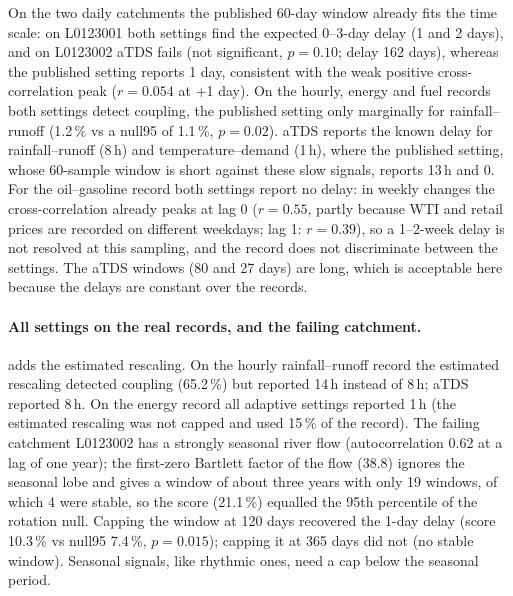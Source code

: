 \documentclass[11pt,a4paper]{article}
\begin{document}
On the two daily catchments the published 60-day window already fits the time scale: on L0123001 both settings find the expected 0--3-day delay (1 and 2 days), and on L0123002 aTDS fails (not significant, $p = 0.10$; delay 162 days), whereas the published setting reports 1 day, consistent with the weak positive cross-correlation peak ($r = 0.054$ at +1 day). On the hourly, energy and fuel records both settings detect coupling, the published setting only marginally for rainfall--runoff (1.2\,\% vs a null95 of 1.1\,\%, $p = 0.02$). aTDS reports the known delay for rainfall--runoff (8\,h) and temperature--demand (1\,h), where the published setting, whose 60-sample window is short against these slow signals, reports 13\,h and 0. For the oil--gasoline record both settings report no delay: in weekly changes the cross-correlation already peaks at lag 0 ($r = 0.55$, partly because WTI and retail prices are recorded on different weekdays; lag 1: $r = 0.39$), so a 1--2-week delay is not resolved at this sampling, and the record does not discriminate between the settings. The aTDS windows (80 and 27 days) are long, which is acceptable here because the delays are constant over the records.

\paragraph{All settings on the real records, and the failing catchment.}  adds the estimated rescaling. On the hourly rainfall--runoff record the estimated rescaling detected coupling (65.2\,\%) but reported 14\,h instead of 8\,h; aTDS reported 8\,h. On the energy record all adaptive settings reported 1\,h (the estimated rescaling was not capped and used 15\,\% of the record). The failing catchment L0123002 has a strongly seasonal river flow (autocorrelation 0.62 at a lag of one year); the first-zero Bartlett factor of the flow (38.8) ignores the seasonal lobe and gives a window of about three years with only 19 windows, of which 4 were stable, so the score (21.1\,\%) equalled the 95th percentile of the rotation null. Capping the window at 120 days recovered the 1-day delay (score 10.3\,\% vs null95 7.4\,\%, $p = 0.015$); capping it at 365 days did not (no stable window). Seasonal signals, like rhythmic ones, need a cap below the seasonal period.


\end{document}
